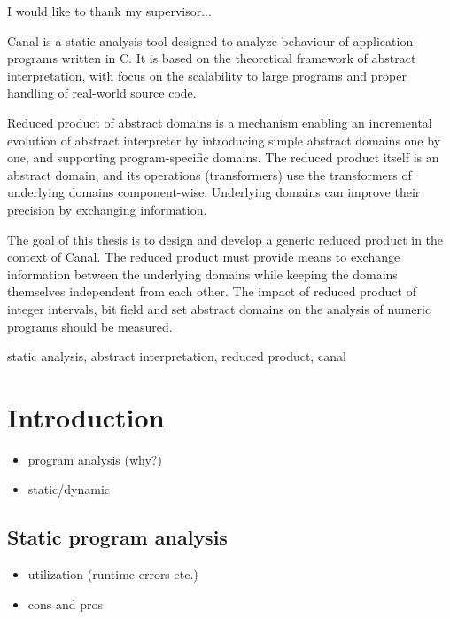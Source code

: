 \documentclass[12pt,oneside,draft]{fithesis2}
\begin{document}
\FrontMatter
\ThesisTitlePage

\begin{ThesisDeclaration}
\DeclarationText
\AdvisorName
\end{ThesisDeclaration}

\begin{ThesisThanks}
I would like to thank my supervisor...
\end{ThesisThanks}

\begin{ThesisAbstract}
Canal is a static analysis tool designed to analyze behaviour of application programs written in C. It is based on the theoretical framework of abstract interpretation, with focus on the scalability to large programs and proper handling of real-world source code.

Reduced product of abstract domains is a mechanism enabling an incremental evolution of abstract interpreter by introducing simple abstract domains one by one, and supporting program-specific domains. The reduced product itself is an abstract domain, and its operations (transformers) use the transformers of underlying domains component-wise. Underlying domains can improve their precision by exchanging information.

The goal of this thesis is to design and develop a generic reduced product in the context of Canal. The reduced product must provide means to exchange information between the underlying domains while keeping the domains themselves independent from each other. The impact of reduced product of integer intervals, bit field and set abstract domains on the analysis of numeric programs should be measured.
\end{ThesisAbstract}

\begin{ThesisKeyWords}
static analysis, abstract interpretation, reduced product, canal
\end{ThesisKeyWords}

\tableofcontents

\MainMatter
\chapter{Introduction}
\begin{itemize}
  \item program analysis (why?)
  \item static/dynamic
\end{itemize}

\section{Static program analysis}
\begin{itemize}
  \item utilization (runtime errors etc.)
  \item cons and pros
\end{itemize}
\end{document}
